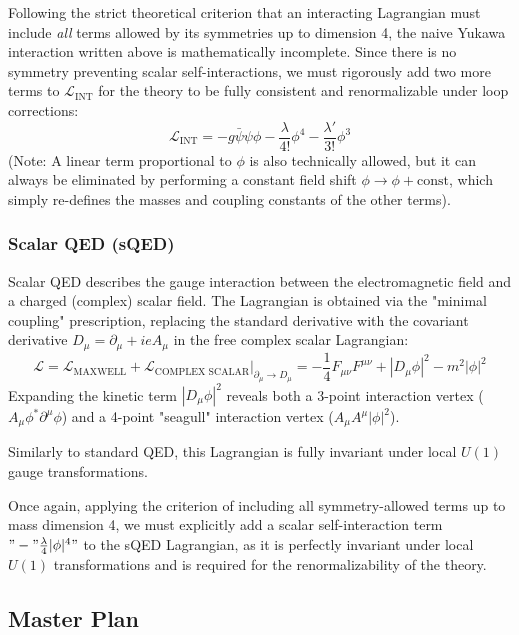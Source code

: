 \begin{remark}
    Following the strict theoretical criterion that an interacting Lagrangian must include \textit{all} terms allowed by its symmetries up to dimension 4, the naive Yukawa interaction written above is mathematically incomplete. Since there is no symmetry preventing scalar self-interactions, we must rigorously add two more terms to \(\mathcal{L}_{\text{INT}}\) for the theory to be fully consistent and renormalizable under loop corrections:
    \[
        \mathcal{L}_{\text{INT}} = -g \bar{\psi}\psi\phi - \frac{\lambda}{4!} \phi^4 - \frac{\lambda'}{3!} \phi^3
    \]
    (Note: A linear term proportional to \(\phi\) is also technically allowed, but it can always be eliminated by performing a constant field shift \(\phi \to \phi + \text{const}\), which simply re-defines the masses and coupling constants of the other terms).
\end{remark}

\subsubsection{Scalar QED (sQED)}

Scalar QED describes the gauge interaction between the electromagnetic field and a charged (complex) scalar field. The Lagrangian is obtained via the "minimal coupling" prescription, replacing the standard derivative with the covariant derivative \(D_\mu = \partial_\mu + ieA_\mu\) in the free complex scalar Lagrangian:
\[
    \mathcal{L} = \mathcal{L}_{\text{MAXWELL}} + \mathcal{L}_{\text{COMPLEX SCALAR}} \big|_{\partial_\mu \to D_\mu} = -\frac{1}{4}F_{\mu\nu}F^{\mu\nu} + |D_\mu \phi|^2 - m^2|\phi|^2
\]
Expanding the kinetic term \(|D_\mu \phi|^2\) reveals both a 3-point interaction vertex (\(A_\mu \phi^* \partial^\mu \phi\)) and a 4-point "seagull" interaction vertex (\(A_\mu A^\mu |\phi|^2\)).

Similarly to standard QED, this Lagrangian is fully invariant under local \(U(1)\) gauge transformations.
\begin{remark}
    Once again, applying the criterion of including all symmetry-allowed terms up to mass dimension 4, we must explicitly add a scalar self-interaction term \("-"\frac{\lambda}{4}|\phi|^4"\) to the sQED Lagrangian, as it is perfectly invariant under local \(U(1)\) transformations and is required for the renormalizability of the theory.
\end{remark}

\subsection{Master Plan}

